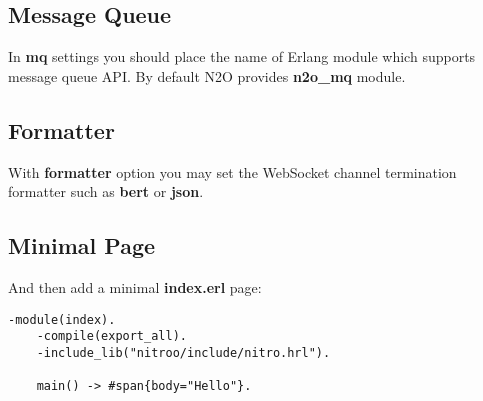 \newpage
\subsection*{Message Queue}
In {\bf mq} settings you should place the name of Erlang module which supports
message queue API. By default N2O provides {\bf n2o\_mq} module.

\subsection*{Formatter}
With {\bf formatter} option you may set the WebSocket channel
termination formatter such as {\bf bert} or {\bf json}.

\subsection*{Minimal Page}
And then add a minimal {\bf index.erl} page:

\vspace{1\baselineskip}
\begin{lstlisting}[caption=index.erl]
    -module(index).
    -compile(export_all).
    -include_lib("nitroo/include/nitro.hrl").

    main() -> #span{body="Hello"}.
\end{lstlisting}
\vspace{1\baselineskip}
